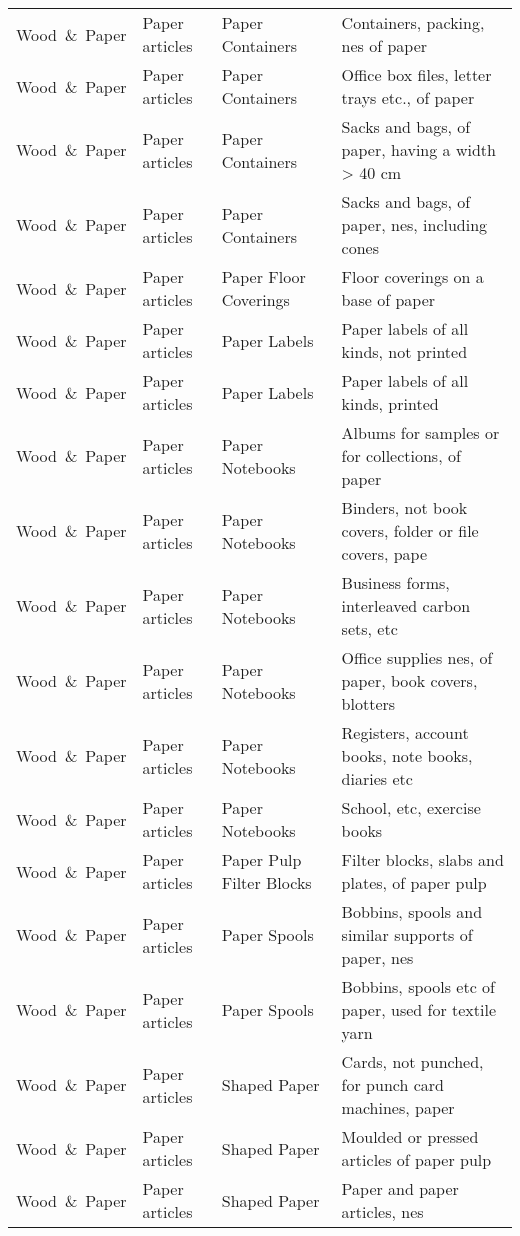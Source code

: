 \begin{appendices}
\begin{xltabular}{\textwidth}{|p{0.10\textwidth}|p{0.25\textwidth}|p{0.20\textwidth}|p{0.35\textwidth}|}
			Wood\ \&\ Paper & Paper articles & Paper Containers & Containers, packing, nes of paper \\
			Wood\ \&\ Paper & Paper articles & Paper Containers & Office box files, letter trays etc., of paper \\
			Wood\ \&\ Paper & Paper articles & Paper Containers & Sacks and bags, of paper, having a width > 40 cm \\
			Wood\ \&\ Paper & Paper articles & Paper Containers & Sacks and bags, of paper, nes, including cones \\
			Wood\ \&\ Paper & Paper articles & Paper Floor Coverings & Floor coverings on a base of paper \\
			Wood\ \&\ Paper & Paper articles & Paper Labels & Paper labels of all kinds, not printed \\
			Wood\ \&\ Paper & Paper articles & Paper Labels & Paper labels of all kinds, printed \\
			Wood\ \&\ Paper & Paper articles & Paper Notebooks & Albums for samples or for collections, of paper \\
			Wood\ \&\ Paper & Paper articles & Paper Notebooks & Binders, not book covers, folder or file covers, pape \\
			Wood\ \&\ Paper & Paper articles & Paper Notebooks & Business forms, interleaved carbon sets, etc \\
			Wood\ \&\ Paper & Paper articles & Paper Notebooks & Office supplies nes, of paper, book covers, blotters \\
			Wood\ \&\ Paper & Paper articles & Paper Notebooks & Registers, account books, note books, diaries etc \\
			Wood\ \&\ Paper & Paper articles & Paper Notebooks & School, etc, exercise books \\
			Wood\ \&\ Paper & Paper articles & Paper Pulp Filter Blocks & Filter blocks, slabs and plates, of paper pulp \\
			Wood\ \&\ Paper & Paper articles & Paper Spools & Bobbins, spools and similar supports of paper, nes \\
			Wood\ \&\ Paper & Paper articles & Paper Spools & Bobbins, spools etc of paper, used for textile yarn \\
			Wood\ \&\ Paper & Paper articles & Shaped Paper & Cards, not punched, for punch card machines, paper \\
			Wood\ \&\ Paper & Paper articles & Shaped Paper & Moulded or pressed articles of paper pulp \\
			Wood\ \&\ Paper & Paper articles & Shaped Paper & Paper and paper articles, nes \\

\end{xltabular}
\end{appendices}
